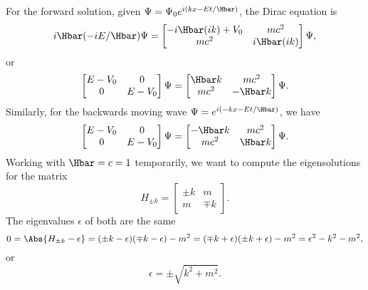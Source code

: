 For the forward solution, given \( \Psi = \Psi_0 e^{i(k x - E t/\Hbar) } \), the Dirac equation is
%
\begin{dmath}\label{eqn:gradQuantumProblemSet4Problem3:20}
i \Hbar (-i E/\Hbar) \Psi =
\begin{bmatrix}
-i \Hbar (i k) + V_0 & m c^2 \\
m c^2 & i \Hbar (i k)
\end{bmatrix}
\Psi,
\end{dmath}
or
\begin{dmath}\label{eqn:gradQuantumProblemSet4Problem3:40}
\begin{bmatrix}
E - V_0 & 0 \\
0 & E - V_0
\end{bmatrix}
\Psi
=
\begin{bmatrix}
\Hbar k & m c^2 \\
m c^2 &  - \Hbar k
\end{bmatrix}
\Psi.
\end{dmath}
%
Similarly, for the backwards moving wave \( \Psi = e^{i(-k x - E t/\Hbar)} \), we have
%
\begin{dmath}\label{eqn:gradQuantumProblemSet4Problem3:60}
\begin{bmatrix}
E - V_0 & 0 \\
0 & E - V_0
\end{bmatrix}
\Psi
=
\begin{bmatrix}
-\Hbar k & m c^2 \\
m c^2 & \Hbar k
\end{bmatrix}
\Psi.
\end{dmath}
%
Working with \( \Hbar = c = 1 \) temporarily, we want to compute the eigensolutions for the matrix
%
\begin{dmath}\label{eqn:gradQuantumProblemSet4Problem3:80}
H_{\pm k}
=
\begin{bmatrix}
\pm k & m \\
m & \mp k
\end{bmatrix}.
\end{dmath}
%
The eigenvalues \( \epsilon \) of both are the same
%
\begin{dmath}\label{eqn:gradQuantumProblemSet4Problem3:100}
0
=
\Abs{ H_{\pm k} - \epsilon }
=
(\pm k - \epsilon)(\mp k - \epsilon) - m^2
=
(\mp k + \epsilon)(\pm k + \epsilon) - m^2
=
\epsilon^2 - k^2 - m^2,
\end{dmath}
%
or
%
\begin{equation}\label{eqn:gradQuantumProblemSet4Problem3:120}
\epsilon = \pm \sqrt{k^2 + m^2}.
\end{equation}
%
